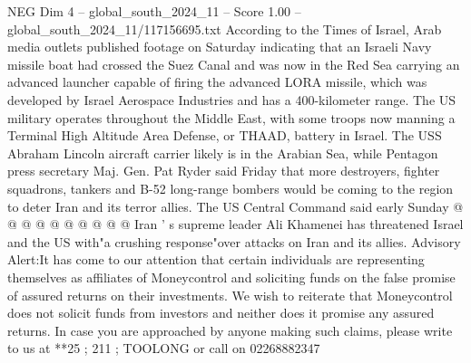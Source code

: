 \begin{textsample}{NEG Dim 4 – global\_south\_2024\_11 – Score 1.00 – global\_south\_2024\_11/117156695.txt}
According to the Times of Israel, Arab media outlets published footage on Saturday indicating that an Israeli Navy missile boat had crossed the Suez Canal and was now in the Red Sea carrying an advanced launcher capable of firing the advanced LORA missile, which was developed by Israel Aerospace Industries and has a 400-kilometer range.
The US military operates throughout the Middle East, with some troops now manning a Terminal High Altitude Area Defense, or THAAD, battery in Israel.
The USS Abraham Lincoln aircraft carrier likely is in the Arabian Sea, while Pentagon press secretary Maj.
Gen.
Pat Ryder said Friday that more destroyers, fighter squadrons, tankers and B-52 long-range bombers would be coming to the region to deter Iran and its terror allies.
The US Central Command said early Sunday @ @ @ @ @ @ @ @ @ @ Iran ' s supreme leader Ali Khamenei has threatened Israel and the US with"a crushing response"over attacks on Iran and its allies.
Advisory Alert:It has come to our attention that certain individuals are representing themselves as affiliates of Moneycontrol and soliciting funds on the false promise of assured returns on their investments.
We wish to reiterate that Moneycontrol does not solicit funds from investors and neither does it promise any assured returns.
In case you are approached by anyone making such claims, please write to us at **25 ; 211 ; TOOLONG or call on 02268882347

\end{textsample}
